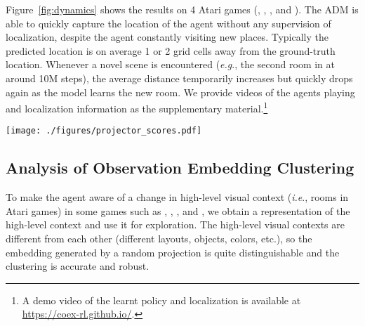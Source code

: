 \documentclass{article} \usepackage{iclr,times}
\makeatletter
\newcommand{\coex}{{CoEX}}
\DeclareRobustCommand\onedot{\futurelet\@let@token\@onedot}
\def\onedot{.}
\def\eg{\emph{e.g}\onedot} \def\Eg{\emph{E.g}\onedot}
\def\ie{\emph{i.e}\onedot} \def\Ie{\emph{I.e}\onedot}
\newcommand{\ProjectURL}{https://coex-rl.github.io/}
\makeatother
\begin{document}
{Figure~\ref{fig:dynamics} shows the results on 4 Atari games
(\MontezumaRevenge, \Seaquest, \Hero, and \Venture).
The ADM is able to quickly capture the location of the agent
without any supervision of localization, despite the agent constantly visiting new places.
Typically the predicted location is
on average 1 or 2 grid cells away from the ground-truth location.
Whenever a novel scene is encountered (\eg, the second room in \MontezumaRevenge at around 10M steps),
the average distance temporarily increases but quickly drops again as the model learns the new room.
We provide videos of the agents playing and localization information as the supplementary material.\footnote{A demo video of the learnt policy and localization is available at
{\footnotesize \url{\ProjectURL}}.
}









\begin{figure*}[tb] \begin{center}
\vspace*{-4pt}
    \texttt{[image: ./figures/projector\_scores.pdf]}
    \vspace*{-15pt}
\caption{
         Curves of ARI score during training of A2C+\coex{},
         averaged over 100 recent observations.
}
    \label{fig:ari_curve}
    \vspace*{-5pt}
    \vspace*{-3pt}
\end{center}
\end{figure*}








\vspace*{-3pt}
\subsection{Analysis of Observation Embedding Clustering}
\vspace*{-4pt}

To make the agent aware of
a change in high-level visual context (\ie, rooms in Atari games)
in some games such as \MontezumaRevenge, \Venture, \Hero, and \PrivateEye,
we obtain a representation of the high-level context and use it for exploration.
The high-level visual contexts are different from each other (different layouts, objects, colors, etc.), so the embedding generated by a random projection is quite distinguishable
and the clustering is accurate and robust.

}
\end{document}
